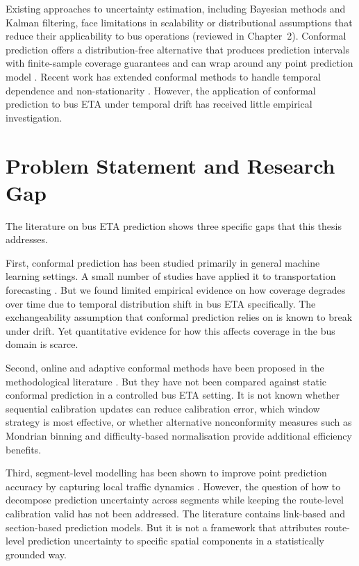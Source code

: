 \documentclass[12pt, a4paper, oneside]{report}
\begin{document}
Existing approaches to uncertainty estimation, including Bayesian methods and Kalman filtering, face limitations in scalability or distributional assumptions that reduce their applicability to bus operations (reviewed in Chapter~2). Conformal prediction offers a distribution-free alternative that produces prediction intervals with finite-sample coverage guarantees and can wrap around any point prediction model \cite{Lei20181094}. Recent work has extended conformal methods to handle temporal dependence \cite{Chernozhukov2018732, Xu202111559} and non-stationarity \cite{Zaffran202225834, Gibbs2024, Barber2023816}. However, the application of conformal prediction to bus ETA under temporal drift has received little empirical investigation.

\section{Problem Statement and Research Gap}

The literature on bus ETA prediction shows three specific gaps that this thesis addresses.

First, conformal prediction has been studied primarily in general machine learning settings. A small number of studies have applied it to transportation forecasting \cite{Petelin2024}. But we found limited empirical evidence on how coverage degrades over time due to temporal distribution shift in bus ETA specifically. The exchangeability assumption that conformal prediction relies on is known to break under drift. Yet quantitative evidence for how this affects coverage in the bus domain is scarce.

Second, online and adaptive conformal methods have been proposed in the methodological literature \cite{Zaffran202225834, Gibbs2024, Angelopoulos2023}. But they have not been compared against static conformal prediction in a controlled bus ETA setting. It is not known whether sequential calibration updates can reduce calibration error, which window strategy is most effective, or whether alternative nonconformity measures such as Mondrian binning and difficulty-based normalisation provide additional efficiency benefits.

Third, segment-level modelling has been shown to improve point prediction accuracy by capturing local traffic dynamics \cite{Chen201160, Dunne2023141}. However, the question of how to decompose prediction uncertainty across segments while keeping the route-level calibration valid has not been addressed. The literature contains link-based and section-based prediction models. But it is not a framework that attributes route-level prediction uncertainty to specific spatial components in a statistically grounded way.
\end{document}
